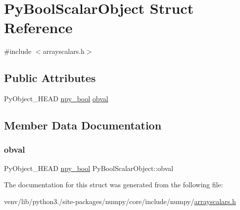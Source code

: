 \hypertarget{structPyBoolScalarObject}{}\section{Py\+Bool\+Scalar\+Object Struct Reference}
\label{structPyBoolScalarObject}


{\ttfamily \#include $<$arrayscalars.\+h$>$}

\subsection*{Public Attributes}
\begin{DoxyCompactItemize}
\item 
Py\+Object\+\_\+\+H\+E\+AD \hyperlink{npy__common_8h_a95307a629b2747f357f81b3853c5d1b6}{npy\+\_\+bool} \hyperlink{structPyBoolScalarObject_a5a0a26b1f60e58289812124abf5271f7}{obval}
\end{DoxyCompactItemize}


\subsection{Member Data Documentation}
\mbox{\label{structPyBoolScalarObject_a5a0a26b1f60e58289812124abf5271f7}} 
\subsubsection{\texorpdfstring{obval}{obval}}
{\footnotesize\ttfamily Py\+Object\+\_\+\+H\+E\+AD \hyperlink{npy__common_8h_a95307a629b2747f357f81b3853c5d1b6}{npy\+\_\+bool} Py\+Bool\+Scalar\+Object\+::obval}



The documentation for this struct was generated from the following file\+:\begin{DoxyCompactItemize}
\item 
venv/lib/python3./site-\/packages/numpy/core/include/numpy/\hyperlink{arrayscalars_8h}{arrayscalars.\+h}\end{DoxyCompactItemize}
